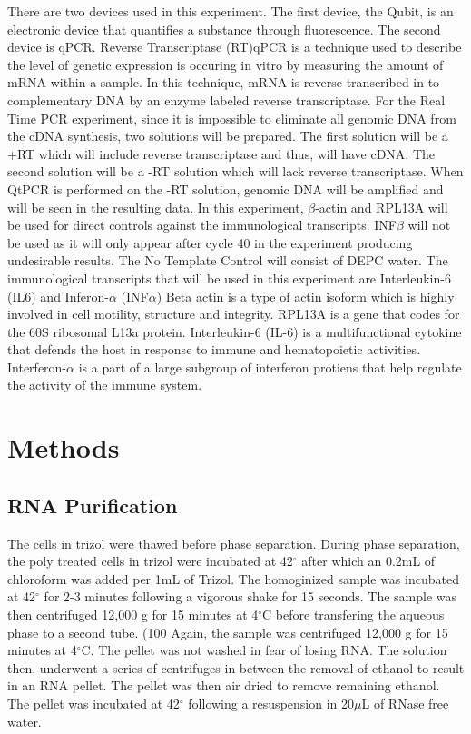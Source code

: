 \documentclass[journal, a4paper]{IEEEtran}
\begin{document}
  There are two devices used in this experiment. The first device, the Qubit, is an electronic device that quantifies a substance through fluorescence.
  The second device is qPCR.
  Reverse Transcriptase (RT)qPCR is a technique used to describe the level of genetic expression is occuring in vitro
  by measuring the amount of mRNA within a sample. In this technique, mRNA is reverse transcribed in to complementary DNA by
  an enzyme labeled reverse transcriptase.
  For the Real Time PCR experiment, since it is impossible to eliminate all genomic DNA from the cDNA synthesis, two solutions will be prepared.
  The first solution will be a +RT which will include reverse transcriptase and thus, will have cDNA.
  The second solution will be a -RT solution which will lack reverse transcriptase.
  When QtPCR is performed on the -RT solution, genomic DNA will be amplified and will be seen in the resulting data.
  In this experiment, $\beta$-actin and RPL13A will be used for direct controls against the immunological transcripts.
  INF$\beta$ will not be used as it will only appear after cycle 40 in the experiment producing undesirable results.
  The No Template Control will consist of DEPC water.
  The immunological transcripts that will be used in this experiment are Interleukin-6 (IL6) and Inferon-$\alpha$ (INF$\alpha$)
  Beta actin is a type of actin isoform which is highly involved in cell motility, structure and integrity.
  RPL13A is a gene that codes for the 60S ribosomal L13a protein.
  Interleukin-6 (IL-6) is a multifunctional cytokine that defends the host in response to immune and hematopoietic activities.
  Interferon-$\alpha$ is a part of a large subgroup of interferon protiens that help regulate the activity of the immune system.

\section{Methods}
    \subsection{RNA Purification}
      The cells in trizol were thawed before phase separation. During phase separation,
      the poly treated cells in trizol were incubated at 42$^{\circ}$ after which an 0.2mL of chloroform was added per 1mL of Trizol.
      The homoginized sample was incubated at 42$^{\circ}$ for 2-3 minutes following a vigorous shake for 15 seconds.
      The sample was then centrifuged 12,000 g for 15 minutes at 4$^{\circ}$C before transfering the aqueous phase
      to a second tube. (100%
      Again, the sample was centrifuged 12,000 g for 15 minutes at 4$^{\circ}$C.
      The pellet was not washed in fear of losing RNA.
      The solution then, underwent a series of centrifuges in between the removal of ethanol to result in an RNA pellet.
      The pellet was then air dried to remove remaining ethanol.
      The pellet was incubated at 42$^{\circ}$ following a resuspension in 20$\mu$L of RNase free water.
\end{document}

